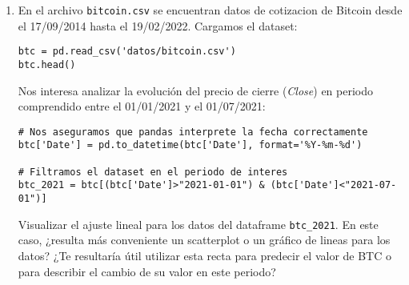 \documentclass[a4paper,11pt]{article}
\theoremstyle{definition}
\begin{document}
\begin{enumerate}[resume]
\begin{enumerate}
\end{enumerate}

\item En el archivo \texttt{bitcoin.csv} se encuentran datos de cotizacion de Bitcoin desde el 17/09/2014 hasta el 19/02/2022. Cargamos el dataset:
\begin{lstlisting}
btc = pd.read_csv('datos/bitcoin.csv')
btc.head()
\end{lstlisting}
Nos interesa analizar la evolución del precio de cierre (\textit{Close}) en periodo comprendido entre el 01/01/2021 y el 01/07/2021:
\begin{lstlisting}
# Nos aseguramos que pandas interprete la fecha correctamente
btc['Date'] = pd.to_datetime(btc['Date'], format='%Y-%m-%d') 

# Filtramos el dataset en el periodo de interes
btc_2021 = btc[(btc['Date']>"2021-01-01") & (btc['Date']<"2021-07-01")]
\end{lstlisting}

Visualizar el ajuste lineal para los datos del dataframe \verb |btc_2021|. En este caso, ¿resulta más conveniente un scatterplot o un gráfico de lineas para los datos? ¿Te resultaría útil utilizar esta recta para predecir el valor de BTC o para describir el cambio de su valor en este periodo?
    


\end{enumerate}
\end{document}
